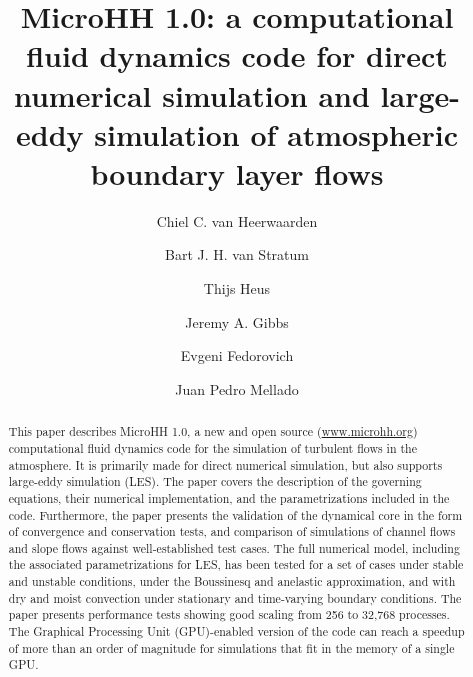 \documentclass[gmd,manuscript]{copernicus}
\begin{document}
\linenumbers

\title{MicroHH 1.0: a computational fluid dynamics code for direct numerical simulation and large-eddy simulation of atmospheric boundary layer flows}

\author[1,2]{Chiel C. van Heerwaarden}
\author[1,2]{Bart J. H. van Stratum}
\author[3]{Thijs Heus}
\author[4]{Jeremy A. Gibbs}
\author[5]{Evgeni Fedorovich}
\author[2]{Juan Pedro Mellado}






\received{}
\pubdiscuss{} %
\revised{}
\accepted{}
\published{}



\maketitle  %

\begin{abstract}
This paper describes MicroHH 1.0, a new and open source (\url{www.microhh.org}) computational fluid dynamics code for the simulation of turbulent flows in the atmosphere. It is primarily made for direct numerical simulation, but also supports large-eddy simulation (LES). The paper covers the description of the governing equations, their numerical implementation, and the parametrizations included in the code. Furthermore, the paper presents the validation of the dynamical core in the form of convergence and conservation tests, and comparison of simulations of channel flows and slope flows against well-established test cases. The full numerical model, including the associated parametrizations for LES, has been tested for a set of cases under stable and unstable conditions, under the Boussinesq and anelastic approximation, and with dry and moist convection under stationary and time-varying boundary conditions. The paper presents performance tests showing good scaling from 256 to 32,768 processes. The Graphical Processing Unit (GPU)-enabled version of the code can reach a speedup of more than an order of magnitude for simulations that fit in the memory of a single GPU.
\end{abstract}
\end{document}
